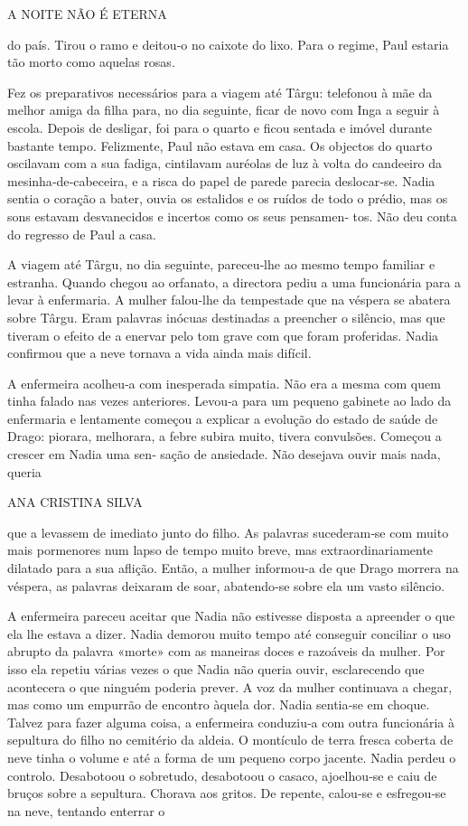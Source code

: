 A NOITE NÃO É ETERNA

do país. Tirou o ramo e deitou‑o no caixote do lixo. Para o regime, Paul
estaria tão morto como aquelas rosas.

Fez os preparativos necessários para a viagem até Târgu: telefonou à mãe
da melhor amiga da filha para, no dia seguinte, ficar de novo com Inga a
seguir à escola. Depois de desligar, foi para o quarto e ficou sentada e
imóvel durante bastante tempo. Felizmente, Paul não estava em casa. Os
objectos do quarto oscilavam com a sua fadiga, cintilavam auréolas de
luz à volta do candeeiro da mesinha‑de‑cabeceira, e a risca do papel de
parede parecia deslocar‑se. Nadia sentia o coração a bater, ouvia os
estalidos e os ruídos de todo o prédio, mas os sons estavam desvanecidos
e incertos como os seus pensamen‑ tos. Não deu conta do regresso de Paul
a casa.

A viagem até Târgu, no dia seguinte, pareceu‑lhe ao mesmo tempo familiar
e estranha. Quando chegou ao orfanato, a directora pediu a uma
funcionária para a levar à enfermaria. A mulher falou‑lhe da tempestade
que na véspera se abatera sobre Târgu. Eram palavras inócuas destinadas
a preencher o silêncio, mas que tiveram o efeito de a enervar pelo tom
grave com que foram proferidas. Nadia confirmou que a neve tornava a
vida ainda mais difícil.

A enfermeira acolheu‑a com inesperada simpatia. Não era a mesma com quem
tinha falado nas vezes anteriores. Levou‑a para um pequeno gabinete ao
lado da enfermaria e lentamente começou a explicar a evolução do estado
de saúde de Drago: piorara, melhorara, a febre subira muito, tivera
convulsões. Começou a crescer em Nadia uma sen‑ sação de ansiedade. Não
desejava ouvir mais nada, queria

ANA CRISTINA SILVA

que a levassem de imediato junto do filho. As palavras sucederam‑se com
muito mais pormenores num lapso de tempo muito breve, mas
extraordinariamente dilatado para a sua aflição. Então, a mulher
informou‑a de que Drago morrera na véspera, as palavras deixaram de
soar, abatendo‑se sobre ela um vasto silêncio.

A enfermeira pareceu aceitar que Nadia não estivesse disposta a
apreender o que ela lhe estava a dizer. Nadia demorou muito tempo até
conseguir conciliar o uso abrupto da palavra «morte» com as maneiras
doces e razoáveis da mulher. Por isso ela repetiu várias vezes o que
Nadia não queria ouvir, esclarecendo que acontecera o que ninguém
poderia prever. A voz da mulher continuava a chegar, mas como um
empurrão de encontro àquela dor. Nadia sentia‑se em choque. Talvez para
fazer alguma coisa, a enfermeira conduziu‑a com outra funcionária à
sepultura do filho no cemitério da aldeia. O montículo de terra fresca
coberta de neve tinha o volume e até a forma de um pequeno corpo
jacente. Nadia perdeu o controlo. Desabotoou o sobretudo, desabotoou o
casaco, ajoelhou‑se e caiu de bruços sobre a sepultura. Chorava aos
gritos. De repente, calou‑se e esfregou‑se na neve, tentando enterrar o

